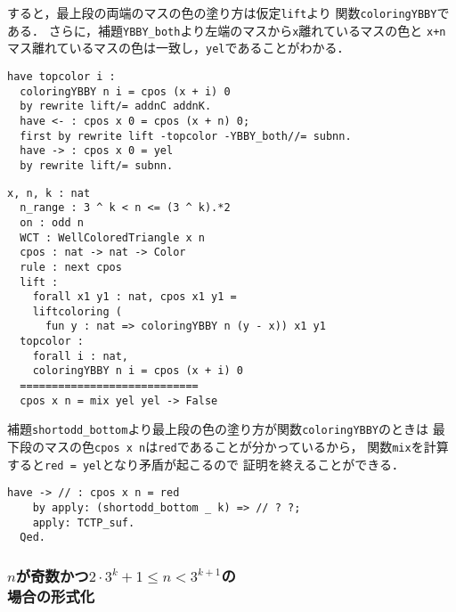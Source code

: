 すると，最上段の両端のマスの色の塗り方は仮定{\tt{lift}}より
関数{\tt{coloringYBBY}}である．
さらに，補題{\tt{YBBY\_both}}より左端のマスから{\tt{x}}離れているマスの色と
{\tt{x+n}}マス離れているマスの色は一致し，{\tt{yel}}であることがわかる．
\begin{lstlisting}[language=Coq]
  have topcolor i :
  coloringYBBY n i = cpos (x + i) 0
  by rewrite lift/= addnC addnK.
  have <- : cpos x 0 = cpos (x + n) 0;
  first by rewrite lift -topcolor -YBBY_both//= subnn.
  have -> : cpos x 0 = yel
  by rewrite lift/= subnn.
\end{lstlisting}
\begin{lstlisting}[language=Coq]
  x, n, k : nat
  n_range : 3 ^ k < n <= (3 ^ k).*2
  on : odd n
  WCT : WellColoredTriangle x n
  cpos : nat -> nat -> Color
  rule : next cpos
  lift :
    forall x1 y1 : nat, cpos x1 y1 =
    liftcoloring (
      fun y : nat => coloringYBBY n (y - x)) x1 y1
  topcolor :
    forall i : nat,
    coloringYBBY n i = cpos (x + i) 0
  ============================
  cpos x n = mix yel yel -> False
\end{lstlisting}
補題{\tt{shortodd\_bottom}}より最上段の色の塗り方が関数{\tt{coloringYBBY}}のときは
最下段のマスの色{\tt{cpos x n}}は{\tt{red}}であることが分かっているから，
関数{\tt{mix}}を計算すると{\tt{red = yel}}となり矛盾が起こるので
証明を終えることができる．
\begin{lstlisting}[language=Coq]
    have -> // : cpos x n = red
    by apply: (shortodd_bottom _ k) => // ? ?;
    apply: TCTP_suf.
  Qed.
\end{lstlisting}

\subsubsection{$n$が奇数かつ$2 \cdot 3^{k} + 1 \leq n < 3^{k+1}$の\\場合の形式化}

